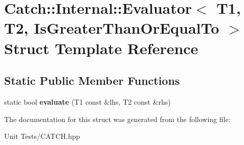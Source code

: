 \hypertarget{structCatch_1_1Internal_1_1Evaluator_3_01T1_00_01T2_00_01IsGreaterThanOrEqualTo_01_4}{}\section{Catch\+:\+:Internal\+:\+:Evaluator$<$ T1, T2, Is\+Greater\+Than\+Or\+Equal\+To $>$ Struct Template Reference}
\label{structCatch_1_1Internal_1_1Evaluator_3_01T1_00_01T2_00_01IsGreaterThanOrEqualTo_01_4}
\subsection*{Static Public Member Functions}
\begin{DoxyCompactItemize}
\item 
static bool {\bfseries evaluate} (T1 const \&lhs, T2 const \&rhs)\hypertarget{structCatch_1_1Internal_1_1Evaluator_3_01T1_00_01T2_00_01IsGreaterThanOrEqualTo_01_4_a5ba107c6da4292b6492a0e5e906f9484}{}\label{structCatch_1_1Internal_1_1Evaluator_3_01T1_00_01T2_00_01IsGreaterThanOrEqualTo_01_4_a5ba107c6da4292b6492a0e5e906f9484}

\end{DoxyCompactItemize}


The documentation for this struct was generated from the following file\+:\begin{DoxyCompactItemize}
\item 
Unit Tests/C\+A\+T\+C\+H.\+hpp\end{DoxyCompactItemize}
